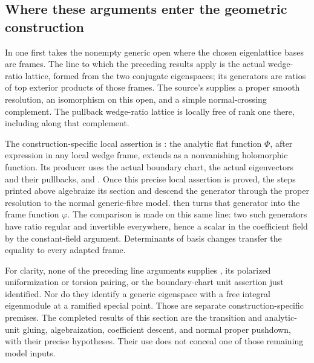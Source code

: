 \subsection{Where these arguments enter the geometric construction}

In  one first takes the nonempty generic
open where the chosen eigenlattice bases are frames.
The line to which the preceding results apply is the actual
wedge-ratio lattice, formed from the two conjugate eigenspaces;
its generators are ratios of top exterior products of those frames.
The source's  supplies a proper
smooth resolution, an isomorphism on this open, and a simple
normal-crossing complement.  The pullback wedge-ratio lattice is
locally free of rank one there, including along that complement.

The construction-specific local assertion is
:
the analytic flat function \(\Phi\), after expression in any
local wedge frame, extends as a nonvanishing holomorphic function.
Its producer  uses the actual
boundary chart, the actual eigenvectors and their pullbacks,
and .
Once this precise local assertion is proved, the steps printed
above algebraize its section and descend the generator through
the proper resolution to the normal generic-fibre model.
 then turns that generator into the
frame function \(\varphi\).
The comparison  is made on this
same line: two such generators have ratio regular and invertible
everywhere, hence a scalar in the coefficient field by the
constant-field argument.  Determinants of basis changes transfer
the equality to every adapted frame.

For clarity, none of the preceding line arguments supplies
, its polarized uniformization or torsion pairing,
or the boundary-chart unit assertion just identified.
Nor do they identify a generic eigenspace with a free integral
eigenmodule at a ramified special point.
Those are separate construction-specific premises.
The completed results of this section are the transition and
analytic-unit gluing, algebraization, coefficient descent, and
normal proper pushdown, with their precise hypotheses.
Their use does not conceal one of those remaining model inputs.
